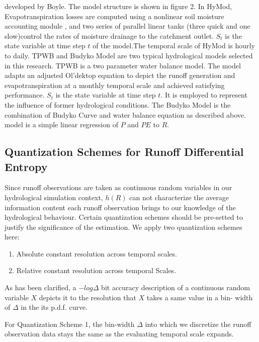 developed by Boyle\cite{boyle2001multicriteria}. The model 
structure is shown in figure 2. In HyMod, 
Evapotranspiration losses are computed using a nonlinear 
soil moisture accounting module \cite
{moore1985probability}, and two series of parallel linear 
tanks (three quick and one slow)control the rates of 
moisture drainage to the catchment outlet.  $S_t$ is the 
state variable at time step $t$ of the model.The temporal 
scale of HyMod is hourly to daily. 
TPWB and Budyko Model are two typical hydrological models 
selected in this research. 
TPWB is a two parameter water balance model\cite
{xiong1999two}. The model adapts an adjusted Ol'dektop 
equation\cite{jobson1982evaporation} to depict the runoff 
generation and evapotranspiration at a monthly temporal 
scale and achieved satisfying performance. $S_t$ is the 
state variable at time step $t$. It is employed to 
represent the influence of former hydrological conditions. 
The Budyko Model is the combination of Budyko Curve and 
water balance equation as described above. %
model is a simple linear regression of $P$ and $PE$ to $R$. 

\subsection{Quantization Schemes for Runoff Differential 
Entropy}

Since runoff observations are taken as continuous random 
variables in our hydrological simulation context, $h(R)$ 
can not characterize the average information content each 
runoff observation brings to our knowledge of the 
hydrological behaviour. Certain quantization schemes should 
be pre-setted to justify the significance of the 
estimation. We apply two quantization schemes here:
\begin{enumerate}
\item Absolute constant resolution across temporal scales.
\item Relative constant resolution across temporal Scales.
\end{enumerate} 

As has been clarified, a $-log\Delta$ bit accuracy 
description of a continuous random variable $X$ depicts it 
to the resolution that $X$ takes a same value in a bin-
width of $\Delta$ in the its p.d.f. curve. 

For Quantization Scheme 1,  the bin-width $\Delta$ into 
which we discretize the runoff observation data stays the 
same as the evaluating temporal scale expands. 

